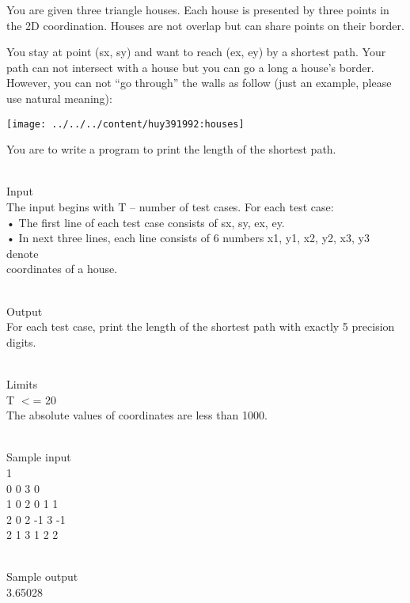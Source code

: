 



   You are given three triangle houses. Each house is presented by three points in the 2D coordination. Houses are not overlap but can share points on their border.  

   You stay at point (sx, sy) and want to reach (ex, ey) by a shortest path. Your path can not intersect with a house but you can go a long a house’s border. However, you can not “go through” the walls as follow (just an example, please use natural meaning):  


\texttt{[image: ../../../content/huy391992:houses]}

   You are to write a program to print the length of the shortest path.  


\\   Input   
\\   The input begins with T – number of test cases. For each test case:   
\\   • The first line of each test case consists of sx, sy, ex, ey.   
\\   • In next three lines, each line consists of 6 numbers x1, y1, x2, y2, x3, y3 denote   
\\   coordinates of a house.  


\\   Output   
\\   For each test case, print the length of the shortest path with exactly 5 precision digits.  


\\   Limits   
\\   T $<$= 20   
\\   The absolute values of coordinates are less than 1000.  


\\   Sample input   
\\   1   
\\   0 0 3 0   
\\   1 0 2 0 1 1   
\\   2 0 2 -1 3 -1   
\\   2 1 3 1 2 2  


\\   Sample output   
\\   3.65028  